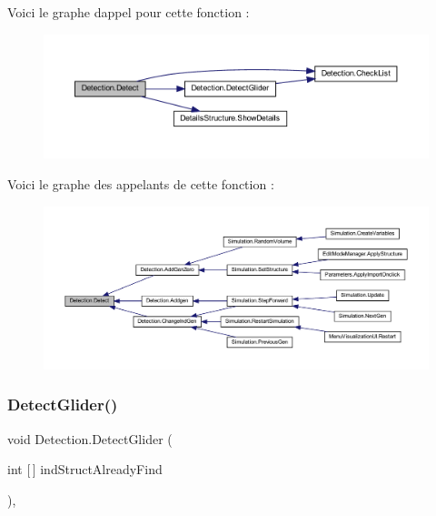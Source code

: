 Voici le graphe d\textquotesingle{}appel pour cette fonction \+:
\nopagebreak
\begin{figure}[H]
\begin{center}
\leavevmode
\includegraphics[width=350pt]{class_detection_a2d43ae8dc03c4247fd0d39787b72213a_cgraph}
\end{center}
\end{figure}
Voici le graphe des appelants de cette fonction \+:
\nopagebreak
\begin{figure}[H]
\begin{center}
\leavevmode
\includegraphics[width=350pt]{class_detection_a2d43ae8dc03c4247fd0d39787b72213a_icgraph}
\end{center}
\end{figure}
\mbox{\label{class_detection_a88c0afc7566ffe8ac32fe1c21da192df}} 
\subsubsection{\texorpdfstring{Detect\+Glider()}{DetectGlider()}}
{\footnotesize\ttfamily void Detection.\+Detect\+Glider (\begin{DoxyParamCaption}\item[{int \mbox{[}$\,$\mbox{]}}]{ind\+Struct\+Already\+Find }\end{DoxyParamCaption})\hspace{0.3cm}{\ttfamily [inline]}, {\ttfamily [private]}}



